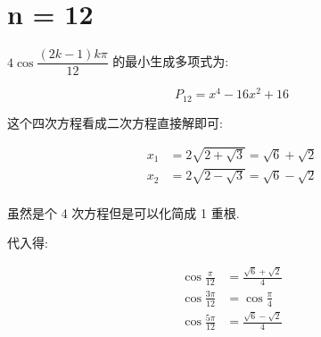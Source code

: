 \chapter{n = 12}\label{ch:cos12}

$4\cos\dfrac{(2k-1)kπ}{12}$ 的最小生成多项式为:

$$
P_{12} = x^4 - 16x^2 + 16
$$

这个四次方程看成二次方程直接解即可:

$$
\begin{aligned}
x_1&=2\sqrt{2+\sqrt{3}}=\sqrt{6}+\sqrt{2}\\
x_2&=2\sqrt{2-\sqrt{3}}=\sqrt{6}-\sqrt{2}\\
\end{aligned}
$$

虽然是个 4 次方程但是可以化简成 1 重根.

代入得:

$$
\begin{aligned}
\cos\frac{  π}{12}&=\frac{\sqrt{6}+\sqrt{2}}{4}\\
\cos\frac{3 π}{12}&=\cos\frac{π}{4}\\
\cos\frac{5 π}{12}&=\frac{\sqrt{6}-\sqrt{2}}{4}\\
\end{aligned}
$$